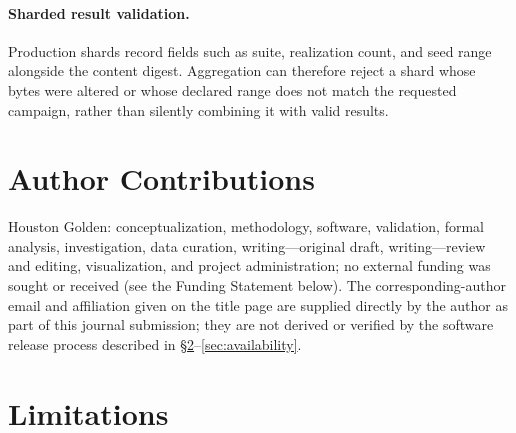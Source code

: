 \documentclass[11pt]{article}
\begin{document}
\paragraph{Sharded result validation.}
Production shards record fields such as suite, realization count, and seed
range alongside the content digest.  Aggregation can therefore reject a shard
whose bytes were altered or whose declared range does not match the requested
campaign, rather than silently combining it with valid results.

\section{Author Contributions}

Houston Golden: conceptualization, methodology, software, validation, formal
analysis, investigation, data curation, writing---original draft,
writing---review and editing, visualization, and project administration; no
external funding was sought or received (see the Funding Statement below).
The corresponding-author email and affiliation given on the title page are
supplied directly by the author as part of this journal submission; they are
not derived or verified by the software release process described in
\S\ref{sec:limitations}--\ref{sec:availability}.

\section{Limitations}
\label{sec:limitations}
\end{document}
